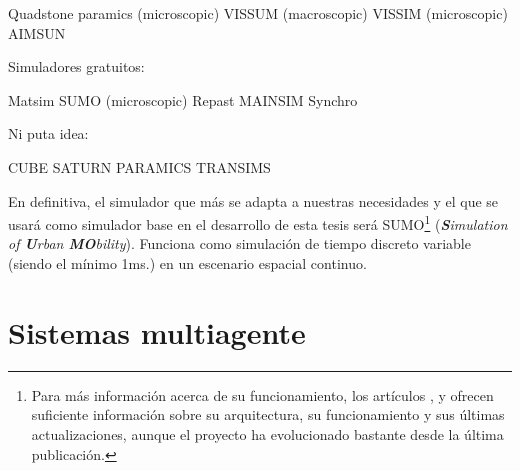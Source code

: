 Quadstone paramics (microscopic)
VISSUM (macroscopic)
VISSIM (microscopic)
AIMSUN

Simuladores gratuitos:

Matsim
SUMO (microscopic)
Repast
MAINSIM
Synchro

Ni puta idea:

CUBE
SATURN
PARAMICS
TRANSIMS

En definitiva, el simulador que más se adapta a nuestras necesidades y el que se usará como simulador base en el desarrollo de esta tesis será SUMO\footnote{Para más información acerca de su funcionamiento, los artículos \cite{krajzewicz2002sumo}, \cite{behrisch2011sumo} y \cite{krajzewicz2012recent} ofrecen suficiente información sobre su arquitectura, su funcionamiento y sus últimas actualizaciones, aunque el proyecto ha evolucionado bastante desde la última publicación.} (\textit{\textbf{S}imulation of \textbf{U}rban \textbf{MO}bility}). Funciona como simulación de tiempo discreto variable (siendo el mínimo 1ms.) en un escenario espacial continuo.


\section{Sistemas multiagente}
